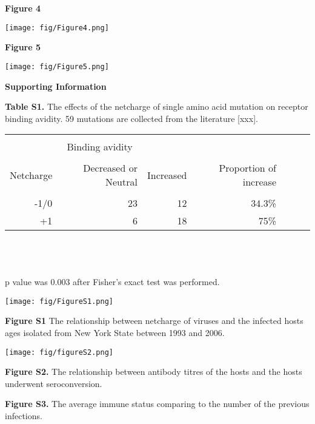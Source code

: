 \documentclass[12pt,a4paper]{article}
\begin{document}
\clearpage

{\bf Figure 4}

\texttt{[image: fig/Figure4.png]}

\clearpage

{\bf Figure 5}

\texttt{[image: fig/Figure5.png]}

\clearpage

{\bf Supporting Information}

\clearpage


{\bf Table S1.} The effects of the netcharge of single amino acid mutation on receptor binding avidity. 59 mutations are collected from the literature [xxx]. 
 
\begin{tabular*}{13cm}{rrrrrrr}

\hline\hline \\%

  &  \multicolumn{1}{c}{Binding avidity}  & &   \\
 	   \cline{2-3} \\
 Netcharge &  Decreased or Neutral &       Increased   & Proportion of increase\\
\hline \\ %

 -1/0 	&  23 	& 	12 &  34.3\% \\

 +1  	&   6 	&   18 &  75\% \\
 
\hline %
\end{tabular*}
\\
\\
\\
p value was 0.003 after Fisher's exact test was performed.


\clearpage

\texttt{[image: fig/FigureS1.png]}

{\bf Figure S1} The relationship between netcharge of viruses and the infected hosts ages isolated from New York State between 1993 and 2006.

\clearpage

\texttt{[image: fig/figureS2.png]}

{\bf Figure S2.}
The relationship between antibody titres of the hosts and the hosts underwent seroconversion.


{\bf Figure S3.}
The average immune status comparing to the number of the previous infections.

\clearpage
\end{document}
